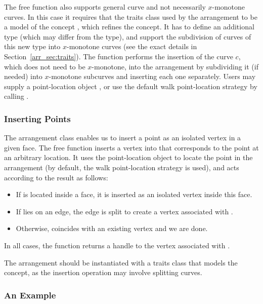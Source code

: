 The free function  also supports general curve and
not necessarily $x$-monotone curves. In this case it requires that the
traits class used by the arrangement  to be a model of the
concept , which refines the
 concept. It has to define an
additional  type (which may differ from the
 type), and support the subdivision of curves
of this new type into $x$-monotone curves (see the exact details in
Section~\ref{arr_sec:traits}). The 
function performs the insertion of the curve $c$, which does not need
to be $x$-monotone, into the arrangement by subdividing it (if needed)
into $x$-monotone subcurves and inserting each one separately. Users
may supply a point-location object , or use the default walk
point-location strategy by calling .

\subsubsection{Inserting Points\label{arr_sssec:insert_point}}

The arrangement class enables us to insert a point as an isolated
vertex in a given face. The free function
 inserts a vertex into  that
corresponds to the point  at an arbitrary location. It uses
the point-location object  to locate the point in the
arrangement (by default, the walk point-location strategy is used),
and acts according to the result as follows:
\begin{itemize}
\item If  is located inside a face, it is inserted as an
isolated vertex inside this face.
\item If  lies on an edge, the edge is split to create a
vertex associated with .
\item Otherwise,  coincides with an existing vertex and
we are done.
\end{itemize}
In all cases, the function returns a handle to the vertex
associated with .

The arrangement  should be instantiated with a traits class
that models the  concept, as the
insertion operation may involve splitting curves.

\subsubsection{An Example\label{arr_sssec:insert_ex}}

